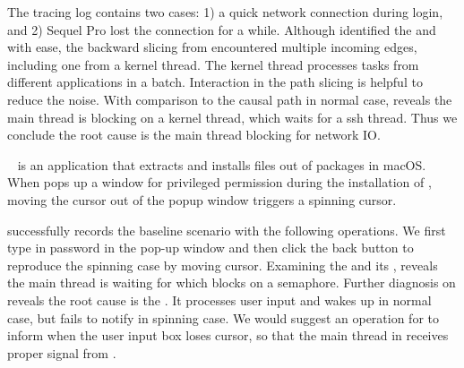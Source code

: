 The tracing log contains two cases: 1) a quick network connection during login,
and 2) Sequel Pro lost the connection for a while. Although \xxx identified the
\spinningnode and \similarnode with ease, the backward slicing from \similarnode
encountered multiple incoming edges, including one from a kernel thread.
The kernel thread processes tasks from different applications in a batch.
Interaction in the path slicing is helpful to reduce the noise. With comparison
to the causal path in normal case, \xxx reveals the main thread is blocking on a
kernel thread, which waits for a ssh thread. Thus we conclude the root cause is
the main thread blocking for network IO.


~\cite{Installer} is an application that extracts and installs
files out of  packages in macOS. When  pops up a window
for privileged permission during the installation of ,
moving the cursor out of the popup window triggers a spinning cursor.

\xxx successfully records the baseline scenario with the following operations.
We first type in password in the pop-up window and then click the back button to
reproduce the spinning case by moving cursor. Examining the \spinningnode and
its \similarnode, \xxx reveals the main thread is waiting for  which
blocks on a semaphore. Further diagnosis on  reveals the root cause
is the . It processes user input and wakes up  in
normal case, but fails to notify  in spinning case. We would suggest
an operation for  to inform  when the user input box
loses cursor, so that the main thread in  receives proper signal
from .

